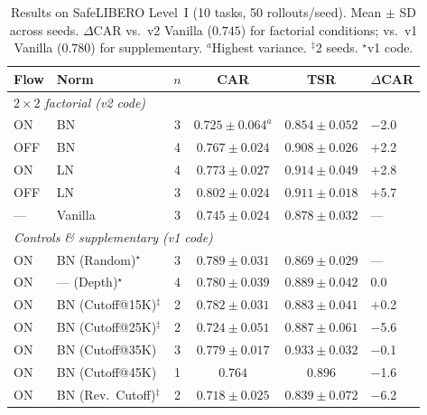 \begin{table}[t]
\centering
\caption{Results on SafeLIBERO Level~I (10 tasks, 50 rollouts/seed). Mean $\pm$ SD across seeds. $\Delta$CAR vs.\ v2 Vanilla ($0.745$) for factorial conditions; vs.\ v1 Vanilla ($0.780$) for supplementary. $^{a}$Highest variance. $^\ddagger$2 seeds. $^\star$v1 code.}
\label{tab:main_results}
\small
\setlength{\tabcolsep}{3pt}
\begin{tabular}{llcccl}
\toprule
Flow & Norm & $n$ & CAR & TSR & $\Delta$CAR \\
\midrule
\multicolumn{6}{l}{\textit{$2{\times}2$ factorial (v2 code)}} \\
ON  & BN & 3 & $0.725 \pm 0.064^{a}$ & $0.854 \pm 0.052$ & $-$2.0 \\
OFF & BN & 4 & $0.767 \pm 0.024$ & $0.908 \pm 0.026$ & $+$2.2 \\
ON  & LN & 4 & $0.773 \pm 0.027$ & $0.914 \pm 0.049$ & $+$2.8 \\
OFF & LN & 3 & $0.802 \pm 0.024$ & $0.911 \pm 0.018$ & $+$5.7 \\
\addlinespace
---  & Vanilla & 3 & $0.745 \pm 0.024$ & $0.878 \pm 0.032$ & --- \\
\midrule
\multicolumn{6}{l}{\textit{Controls \& supplementary (v1 code)}} \\
ON  & BN (Random)$^\star$ & 3 & $0.789 \pm 0.031$ & $0.869 \pm 0.029$ & --- \\
ON  & --- (Depth)$^\star$ & 4 & $0.780 \pm 0.039$ & $0.889 \pm 0.042$ & $0.0$ \\
ON  & BN (Cutoff@15K)$^\ddagger$ & 2 & $0.782 \pm 0.031$ & $0.883 \pm 0.041$ & $+$0.2 \\
ON  & BN (Cutoff@25K)$^\ddagger$ & 2 & $0.724 \pm 0.051$ & $0.887 \pm 0.061$ & $-$5.6 \\
ON  & BN (Cutoff@35K)       & 3 & $0.779 \pm 0.017$ & $0.933 \pm 0.032$ & $-$0.1 \\
ON  & BN (Cutoff@45K)       & 1 & $0.764$           & $0.896$           & $-$1.6 \\
ON  & BN (Rev.\ Cutoff)$^\ddagger$ & 2 & $0.718 \pm 0.025$ & $0.839 \pm 0.072$ & $-$6.2 \\
\bottomrule
\end{tabular}
\end{table}

